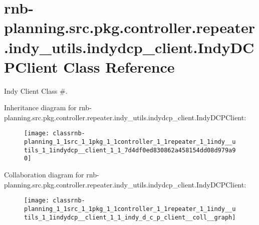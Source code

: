 \hypertarget{classrnb-planning_1_1src_1_1pkg_1_1controller_1_1repeater_1_1indy__utils_1_1indydcp__client_1_1_indy_d_c_p_client}{}\section{rnb-\/planning.src.\+pkg.\+controller.\+repeater.\+indy\+\_\+utils.\+indydcp\+\_\+client.\+Indy\+D\+C\+P\+Client Class Reference}
\label{classrnb-planning_1_1src_1_1pkg_1_1controller_1_1repeater_1_1indy__utils_1_1indydcp__client_1_1_indy_d_c_p_client}


Indy Client Class \#.  




Inheritance diagram for rnb-\/planning.src.\+pkg.\+controller.\+repeater.\+indy\+\_\+utils.\+indydcp\+\_\+client.\+Indy\+D\+C\+P\+Client\+:
\nopagebreak
\begin{figure}[H]
\begin{center}
\leavevmode
\texttt{[image: classrnb-planning\_1\_1src\_1\_1pkg\_1\_1controller\_1\_1repeater\_1\_1indy\_\_utils\_1\_1indydcp\_\_client\_1\_1\_7d4df0ed830862a458154dd08d979a90]}
\end{center}
\end{figure}


Collaboration diagram for rnb-\/planning.src.\+pkg.\+controller.\+repeater.\+indy\+\_\+utils.\+indydcp\+\_\+client.\+Indy\+D\+C\+P\+Client\+:
\nopagebreak
\begin{figure}[H]
\begin{center}
\leavevmode
\texttt{[image: classrnb-planning\_1\_1src\_1\_1pkg\_1\_1controller\_1\_1repeater\_1\_1indy\_\_utils\_1\_1indydcp\_\_client\_1\_1\_indy\_d\_c\_p\_client\_\_coll\_\_graph]}
\end{center}
\end{figure}
